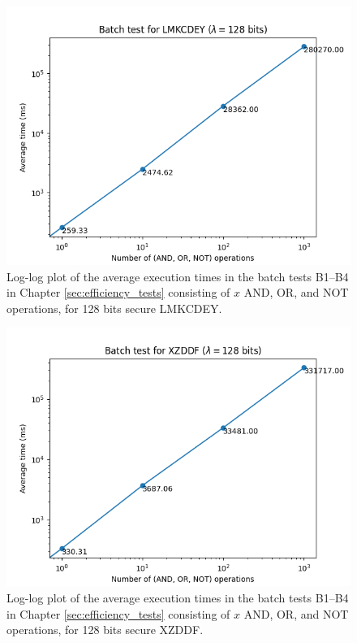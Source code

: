 \begin{figure}[ht]
    \centering
    \includegraphics[width=0.8\linewidth]{data/figures/LMKCDEY_STD128LMKCDEY_batch.png}
    \caption{Log-log plot of the average execution times in the batch tests B1--B4 in Chapter \ref{sec:efficiency_tests} consisting of $x$ AND, OR, and NOT operations, for 128 bits secure LMKCDEY.}
    \label{fig:batch_lmkcdey128}
\end{figure}

\begin{figure}[ht]
    \centering
    \includegraphics[width=0.8\linewidth]{data/figures/XZDDF_STD128_batch.png}
    \caption{Log-log plot of the average execution times in the batch tests B1--B4 in Chapter \ref{sec:efficiency_tests} consisting of $x$ AND, OR, and NOT operations, for 128 bits secure XZDDF.}
    \label{fig:batch_xzddf128}
\end{figure}


